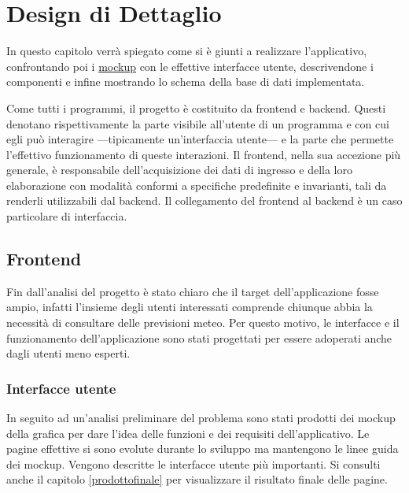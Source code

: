 \chapter{Design di Dettaglio}
In questo capitolo verrà spiegato come si è giunti a realizzare l’applicativo,
confrontando poi i \href{https://github.com/Weather-Vortex/WeatherVortex-Report/raw/main/MockUps/WeatherVortex-Mockup.pdf}{mockup} con le effettive interfacce utente, descrivendone i componenti e infine mostrando lo schema della base di dati implementata.

Come tutti i programmi, il progetto è costituito da  frontend e backend.
Questi denotano rispettivamente la parte visibile all'utente di un programma e con cui egli può interagire —tipicamente un'interfaccia utente— e la parte che permette l'effettivo funzionamento di queste interazioni. \newline
Il frontend, nella sua accezione più generale, è responsabile dell'acquisizione dei dati di ingresso e della loro elaborazione con modalità conformi a specifiche predefinite e invarianti, tali da renderli utilizzabili dal backend. Il collegamento del frontend al backend è un caso particolare di interfaccia.

\section{Frontend}
Fin dall'analisi del progetto è stato chiaro che il target dell'applicazione fosse ampio, infatti l'insieme degli utenti interessati comprende chiunque abbia la
necessità di consultare delle previsioni meteo.
Per questo motivo, le interfacce e il funzionamento dell'applicazione sono stati progettati per essere adoperati anche dagli utenti meno esperti.

\subsection{Interfacce utente}
In seguito ad un'analisi preliminare del problema sono stati prodotti dei mockup della grafica per dare l'idea delle funzioni e dei requisiti dell'applicativo. 
Le pagine effettive si sono evolute durante lo sviluppo ma mantengono le linee guida dei mockup. 
Vengono descritte le interfacce utente più importanti.
Si consulti anche il capitolo \ref{prodottofinale} per visualizzare il risultato finale delle pagine.

